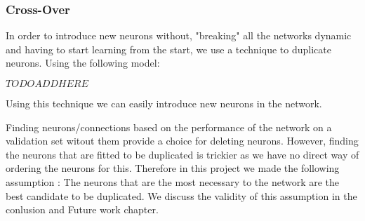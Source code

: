 \subsubsection{Cross-Over}

In order to introduce new neurons without, "breaking" all the networks dynamic and having to start learning from the start, we use a technique to duplicate neurons. Using the following model: 

$TODO ADD HERE$ 

Using this technique we can easily introduce new neurons in the network.

Finding neurons/connections based on the performance of the network on a validation set witout them provide a choice for deleting neurons. However, finding the neurons that are fitted to be duplicated is trickier as we have no direct way of ordering the neurons for this. Therefore in this project we made the following assumption : The neurons that are the most necessary to the network are the best candidate to be duplicated. We discuss the validity of this assumption in the conlusion and Future work chapter.  


